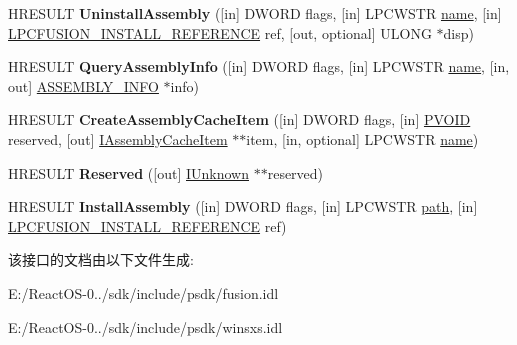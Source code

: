 \begin{DoxyCompactItemize}
\item 
\mbox{\label{interface_i_assembly_cache_ae2b9c05239dc2e64684f983c79799d0f}} 
H\+R\+E\+S\+U\+LT {\bfseries Uninstall\+Assembly} (\mbox{[}in\mbox{]} D\+W\+O\+RD flags, \mbox{[}in\mbox{]} L\+P\+C\+W\+S\+TR \hyperlink{structname}{name}, \mbox{[}in\mbox{]} \hyperlink{struct_i_assembly_cache_1_1___f_u_s_i_o_n___i_n_s_t_a_l_l___r_e_f_e_r_e_n_c_e__}{L\+P\+C\+F\+U\+S\+I\+O\+N\+\_\+\+I\+N\+S\+T\+A\+L\+L\+\_\+\+R\+E\+F\+E\+R\+E\+N\+CE} ref, \mbox{[}out, optional\mbox{]} U\+L\+O\+NG $\ast$disp)
\item 
\mbox{\label{interface_i_assembly_cache_aeab9a7b2c6d90262e4d0468e9d4f44cb}} 
H\+R\+E\+S\+U\+LT {\bfseries Query\+Assembly\+Info} (\mbox{[}in\mbox{]} D\+W\+O\+RD flags, \mbox{[}in\mbox{]} L\+P\+C\+W\+S\+TR \hyperlink{structname}{name}, \mbox{[}in, out\mbox{]} \hyperlink{struct_i_assembly_cache_1_1___a_s_s_e_m_b_l_y___i_n_f_o}{A\+S\+S\+E\+M\+B\+L\+Y\+\_\+\+I\+N\+FO} $\ast$info)
\item 
\mbox{\label{interface_i_assembly_cache_a6d076713af8cf2620b7bb59d60a64efa}} 
H\+R\+E\+S\+U\+LT {\bfseries Create\+Assembly\+Cache\+Item} (\mbox{[}in\mbox{]} D\+W\+O\+RD flags, \mbox{[}in\mbox{]} \hyperlink{interfacevoid}{P\+V\+O\+ID} reserved, \mbox{[}out\mbox{]} \hyperlink{interface_i_assembly_cache_item}{I\+Assembly\+Cache\+Item} $\ast$$\ast$item, \mbox{[}in, optional\mbox{]} L\+P\+C\+W\+S\+TR \hyperlink{structname}{name})
\item 
\mbox{\label{interface_i_assembly_cache_abd48615b466eb909c17002b9e2b57d4f}} 
H\+R\+E\+S\+U\+LT {\bfseries Reserved} (\mbox{[}out\mbox{]} \hyperlink{interface_i_unknown}{I\+Unknown} $\ast$$\ast$reserved)
\item 
\mbox{\label{interface_i_assembly_cache_a6ff474d312b954172c4447dc3b97f7e1}} 
H\+R\+E\+S\+U\+LT {\bfseries Install\+Assembly} (\mbox{[}in\mbox{]} D\+W\+O\+RD flags, \mbox{[}in\mbox{]} L\+P\+C\+W\+S\+TR \hyperlink{structpath}{path}, \mbox{[}in\mbox{]} \hyperlink{struct_i_assembly_cache_1_1___f_u_s_i_o_n___i_n_s_t_a_l_l___r_e_f_e_r_e_n_c_e__}{L\+P\+C\+F\+U\+S\+I\+O\+N\+\_\+\+I\+N\+S\+T\+A\+L\+L\+\_\+\+R\+E\+F\+E\+R\+E\+N\+CE} ref)
\end{DoxyCompactItemize}


该接口的文档由以下文件生成\+:\begin{DoxyCompactItemize}
\item 
E\+:/\+React\+O\+S-\/0../sdk/include/psdk/fusion.\+idl\item 
E\+:/\+React\+O\+S-\/0../sdk/include/psdk/winsxs.\+idl\end{DoxyCompactItemize}

